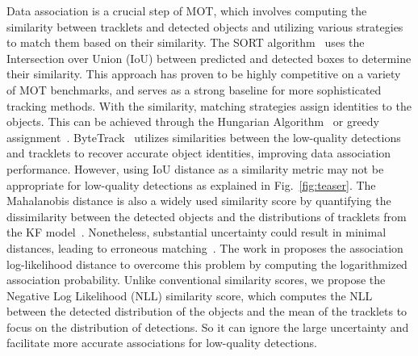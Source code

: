 Data association is a crucial step of MOT, which involves computing the similarity between tracklets and detected objects and utilizing various strategies to match them based on their similarity. 
The SORT algorithm~\cite{bewley2016simple} uses the Intersection over Union (IoU) between predicted and detected boxes to determine their similarity. This approach has proven to be highly competitive on a variety of MOT benchmarks, and serves as a strong baseline for more sophisticated tracking methods.
With the similarity, matching strategies assign identities to the objects. This can be achieved through the Hungarian Algorithm~\cite{kuhn1955hungarian} or greedy assignment~\cite{zhou2020tracking}. 
ByteTrack~\cite{zhang2021bytetrack} utilizes similarities between the low-quality detections and tracklets to recover accurate object identities,  improving data association performance.
However, using IoU distance as a similarity metric may not be appropriate for low-quality detections as explained in Fig.~\ref{fig:teaser}. 
The Mahalanobis distance is also a widely used similarity score by quantifying the dissimilarity between the detected objects and the distributions of tracklets from the KF model~\cite{bertozzi2004pedestrian}. Nonetheless, substantial uncertainty could result in minimal distances, leading to erroneous matching~\cite{altendorfer2016association,wojke2017simple}. 
The work in \cite{altendorfer2016association} proposes the association log-likelihood distance to overcome this problem by computing the logarithmized association probability.
Unlike conventional similarity scores, we propose the Negative Log Likelihood (NLL) similarity score, which computes the NLL between the detected distribution of the objects and the mean of the tracklets to focus on the distribution of detections. So it can ignore the large uncertainty and facilitate more accurate associations for low-quality detections.



